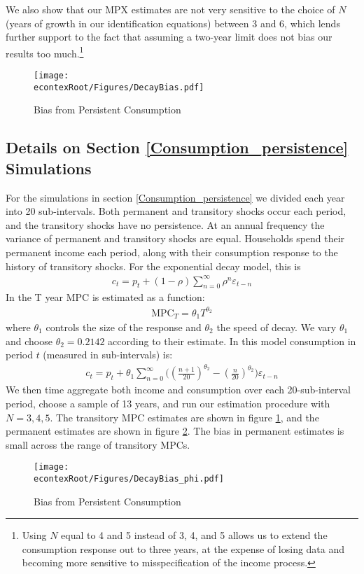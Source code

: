 \documentclass[titlepage]{\econtex}\newcommand{\texname}{ConsumptionHeterogeneity}
\begin{document}
	We also show that our MPX estimates are not very sensitive to the choice of $N$ (years of growth in our identification equations) between 3 and 6, which lends further support to the fact that assuming a two-year limit does not bias our results too much.\footnote{Using $N$ equal to 4 and 5 instead of 3, 4, and 5 allows us to extend the consumption response out to three years, at the expense of losing data and becoming more sensitive to misspecification of the income process.}
	\begin{figure} 
		\begin{centering}
			\texttt{[image: \\econtexRoot/Figures/DecayBias.pdf]}
			\caption{Bias from Persistent Consumption}
			\label{fig:DecayBias}
		\end{centering}
	\end{figure}
	
	\subsection{Details on Section \ref{Consumption_persistence} Simulations}
	For the simulations in section \ref{Consumption_persistence} we divided each year into 20 sub-intervals. Both permanent and transitory shocks occur each period, and the transitory shocks have no persistence. At an annual frequency the variance of permanent and transitory shocks are equal. Households spend their permanent income each period, along with their consumption response to the history of transitory shocks. For the exponential decay model, this is
	\begin{align*}
	c_t = p_t + (1-\rho)\sum_{n=0}^{\infty}\rho^n \varepsilon_{t-n}
	\end{align*}
	In \cite{fagereng_mpc_2016} the T year MPC is estimated as a function:
	\begin{align*}
	\text{MPC}_T = \theta_1 T^{\theta_2}
	\end{align*}
	where $\theta_1$ controls the size of the response and $\theta_2$ the speed of decay. We vary $\theta_1$ and choose $\theta_2= 0.2142$ according to their estimate. In this model consumption in period $t$ (measured in sub-intervals) is:
	\begin{align*}
	c_t = p_t + \theta_1\sum_{n=0}^{\infty}\Big( (\frac{n+1}{20})^{\theta_2} -(\frac{n}{20})^{\theta_2} \Big)\varepsilon_{t-n}
	\end{align*}
	We then time aggregate both income and consumption over each 20-sub-interval period, choose a sample of 13 years, and run our estimation procedure with $N=3,4,5$. The transitory MPC estimates are shown in figure \ref{fig:DecayBias}, and the permanent estimates are shown in figure \ref{fig:DecayBias_phi}. The bias in permanent estimates is small across the range of transitory MPCs.
	\begin{figure} 
		\begin{centering}
			\texttt{[image: \\econtexRoot/Figures/DecayBias\_phi.pdf]}
			\caption{Bias from Persistent Consumption}
			\label{fig:DecayBias_phi}
		\end{centering}
	\end{figure}
\end{document}
